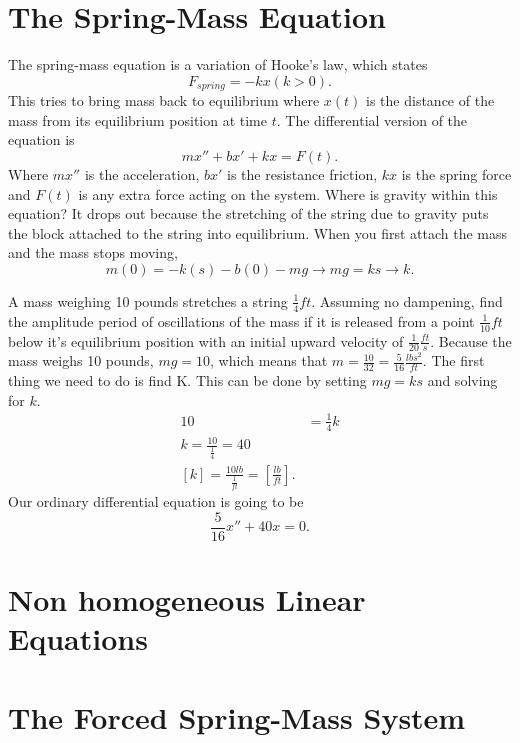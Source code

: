 \section{The Spring-Mass Equation}

  The spring-mass equation is a variation of Hooke's law, which states
  \[
    F_{spring}=-kx(k>0)
  .\] 
  This tries to bring mass back to equilibrium where $x(t)$ is the distance of the mass from its equilibrium position at time $t$. The differential version of the equation is
  \[
    mx''+bx'+kx=F(t)
  .\] 
  Where $mx''$ is the acceleration, $bx'$ is the resistance friction, $kx$ is the spring force and $F(t)$ is any extra force acting on the system. Where is gravity within this equation? It drops out because the stretching of the string due to gravity puts the block attached to the string into equilibrium.\newline\newline
  When you first attach the mass and the mass stops moving,
  \[
    m(0)=-k(s)-b(0)-mg\to mg=ks\to k
  .\] 
  \begin{problem}
    A mass weighing 10 pounds stretches a string $\frac{1}{4}ft$. Assuming no dampening, find the amplitude period of oscillations of the mass if it is released from a point $\frac{1}{10}ft$below it's equilibrium position with an initial upward velocity of $\frac{1}{20}\frac{ft}{s}$.\newline
    Because the mass weighs 10 pounds, $mg=10$, which means that $m=\frac{10}{32}=\frac{5}{16}\frac{lbs^2}{ft}$. The first thing we need to do is find K. This can be done by setting $mg=ks$ and solving for $k$.
    \begin{align*}
      10&=\frac{1}{4}k\\
      k=\frac{10}{\frac{1}{4}}=40\\
      [k]=\frac{10lb}{\frac{1}{ft}}=\left[\frac{lb}{ft}\right]
    .\end{align*}
    Our ordinary differential equation is going to be 
    \[
    \frac{5}{16}x''+40x=0
    .\] 
  \end{problem}
\section{Non homogeneous Linear Equations}

\section{The Forced Spring-Mass System}
